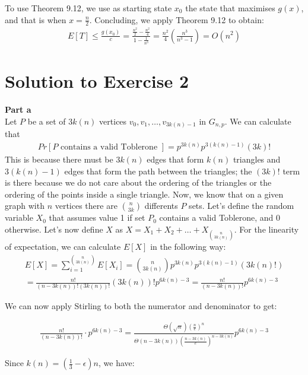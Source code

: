 \documentclass[a4paper,german]{article}
\begin{document}
To use Theorem 9.12, we use as starting state $x_0$ the state that maximises $g(x)$, and that is when $x = \frac{n}{2}$.
Concluding, we apply Theorem 9.12 to obtain:
\begin{align*}
	E[T] \leq \frac{g(x_0)}{c} = \frac{\frac{n^2}{2} - \frac{n^2}{4}}{1 - \frac{1}{n^3}} 
	= \frac{n^2}{4} \left(\frac{n^3}{n^3-1}\right)   = O(n^2)
\end{align*}


\section*{Solution to Exercise 2}
\textbf{Part a} \\

Let $P$ be a set of $3k(n)$ vertices $v_0, v_1, \ldots,  v_{3k(n) - 1}$ in $G_{n,p}$.
We can calculate that 
\begin{align*}
	Pr [ P \text{ contains a valid Toblerone }] = p^{3k(n)} p^{3(k(n) - 1)} (3k)!
\end{align*}
This is because there must be $3k(n)$ edges that form $k(n)$ triangles and $3(k(n) - 1)$ edges that 
form the path between the triangles; the $(3k)!$ term is there because we do not care about the ordering of the triangles or the ordering of the points inside a single triangle. Now, we know that on a given graph with $n$ vertices
there are ${n \choose 3k}$ differents $P$ sets. Let's define the random variable $X_0$ that assumes value
1 if set $P_0$ contains a valid Toblerone, and 0 otherwise. Let's now define 
$X$ as $X = X_1 + X_2 + \ldots + X_{n \choose 3k(n)}$. 
For the linearity of expectation, we can calculate $E[X]$ in the following way:
\begin{align*}
	E[X] = \sum_{i=1}^{n \choose 3k(n)} E[X_i]
	= {n \choose 3k(n)} p^{3k(n)}p^{3(k(n) - 1)}(3k(n)!) 
	\\  = \frac{n!}{(n - 3k(n))!(3k(n))!} (3k(n))!p^{6k(n) - 3} 
	= \frac{n!}{(n - 3k(n))!} p^{6k(n) - 3}
\end{align*}

We can now apply Stirling to both the numerator and denominator to get:

\begin{align*}
	\frac{n!}{(n - 3k(n))!} \cdot p^{6k(n) - 3} = \frac{\Theta(\sqrt{n}){(\frac{n}{e})^n}}
	{\Theta(n - 3k(n)) (\frac{n - 3k(n)}{e})^{n - 3k(n)}}p^{6k(n) - 3}
\end{align*}

Since $k(n) = (\frac{1}{3} - \epsilon) n$, we have:
\end{document}
